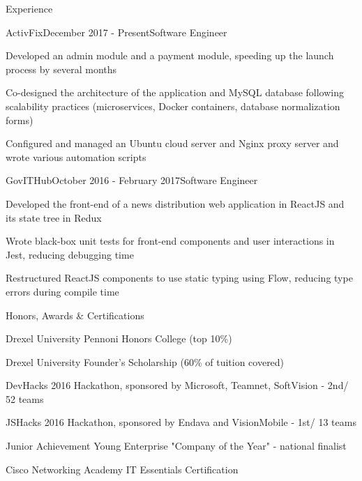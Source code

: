\documentclass{resume} %
\begin{document}
\begin{rSection}{Experience}

\begin{rSubsection}{ActivFix}{December 2017 - Present}{Software Engineer}{}
\item Developed an admin module and a payment module, speeding up the launch process by several months
\item Co-designed the architecture of the application and MySQL database following scalability practices (microservices, Docker containers, database normalization forms)
\item Configured and managed an Ubuntu cloud server and Nginx proxy server and wrote various automation scripts
\end{rSubsection}


\begin{rSubsection}{GovITHub}{October 2016 - February 2017}{Software Engineer}{}
\item Developed the front-end of a news distribution web application in ReactJS and its state tree in Redux
\item Wrote black-box unit tests for front-end components and user interactions in Jest, reducing debugging time
\item Restructured ReactJS components to use static typing using Flow, reducing type errors during compile time
\end{rSubsection}

\end{rSection}


\begin{rSection}{Honors, Awards \& Certifications}
\begin{rSubsection}{}{}{}{}
\item Drexel University Pennoni Honors College (top 10\%)
\item Drexel University Founder’s Scholarship (60\% of tuition covered)
\item DevHacks 2016 Hackathon, sponsored by Microsoft, Teamnet, SoftVision - 2nd/ 52 teams
\item JSHacks 2016 Hackathon, sponsored by Endava and VisionMobile - 1st/ 13 teams
\item Junior Achievement Young Enterprise "Company of the Year" - national finalist
\item Cisco Networking Academy IT Essentials Certification
\end{rSubsection}
\end{rSection}
\end{document}
